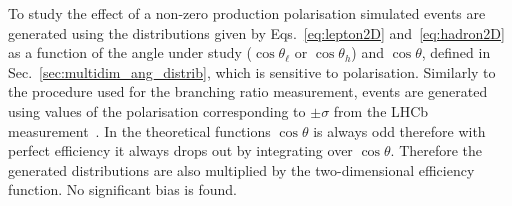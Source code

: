 To study the effect of a non-zero \Lb production polarisation simulated events are generated 
using the distributions given by Eqs.~\ref{eq:lepton2D} and~\ref{eq:hadron2D} as a function of the
angle under study ($\cos\theta_\ell$ or $\cos\theta_h$) and $\cos\theta$, defined in Sec.~\ref{sec:multidim_ang_distrib}, 
which is sensitive to polarisation.
Similarly to the procedure used for the branching ratio measurement, events are generated using
values of the polarisation corresponding to $\pm \sigma$ from the LHCb measurement~\cite{Aaij:2013oxa}.
In the theoretical functions $\cos \theta$ is always odd therefore with perfect efficiency it always
drops out by integrating over $\cos\theta$. Therefore the generated distributions are also multiplied by
the two-dimensional efficiency function. No significant bias is found.





